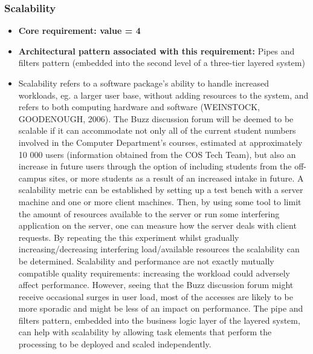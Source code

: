 \documentclass[a4paper]{article}
\begin{document}
\subsubsection{Scalability}
\begin{itemize}
	\item \textbf{Core requirement: value = 4}
	\item \textbf{Architectural pattern associated with this requirement:} Pipes and filters pattern (embedded into the second level of a three-tier layered system) 
	\item Scalability refers to a software package’s ability to handle increased workloads, eg. a larger user base, without adding resources to the system, and refers to both computing hardware and software (WEINSTOCK, GOODENOUGH, 2006). The Buzz discussion forum will be deemed to be scalable if it can accommodate not only all of the current student numbers involved in the Computer Department’s courses, estimated at approximately 10 000 users (information obtained from the COS Tech Team), but also an increase in future users through the option of including students from the off-campus sites, or more students as a result of an increased intake in future. A scalability metric can be established by setting up a test bench with a server machine and one or more client machines. Then, by using some tool to limit the amount of resources available to the server or run some interfering application on the server, one can measure how the server deals with client requests. By repeating the this experiment whilst gradually increasing/decreasing interfering load/available resources the scalability can be determined. Scalability and performance are not exactly mutually compatible quality requirements: increasing the workload could adversely affect performance. However, seeing that the Buzz discussion forum might receive occasional surges in user load, most of the accesses are likely to be more sporadic and might be less of an impact on performance. The pipe and filters pattern, embedded into the business logic layer of the layered system, can help with scalability by allowing task elements that perform the processing to be deployed and scaled independently.
\end{itemize}
\end{document}
